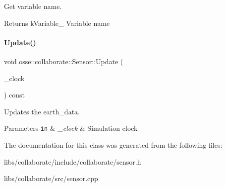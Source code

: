 Get variable name. 

\begin{DoxyReturn}{Returns}
k\+Variable\+\_\+ Variable name 
\end{DoxyReturn}
\mbox{\label{classosse_1_1collaborate_1_1_sensor_a58a36b29c3872dffecfe386610d45095}} 
\paragraph{\texorpdfstring{Update()}{Update()}}
{\footnotesize\ttfamily void osse\+::collaborate\+::\+Sensor\+::\+Update (\begin{DoxyParamCaption}\item[{const \hyperlink{classosse_1_1collaborate_1_1_simulation_clock}{Simulation\+Clock} \&}]{\+\_\+clock }\end{DoxyParamCaption}) const}



Updates the earth\+\_\+data. 


\begin{DoxyParams}[1]{Parameters}
\mbox{\tt in}  & {\em \+\_\+clock} & Simulation clock \\
\hline
\end{DoxyParams}


The documentation for this class was generated from the following files\+:\begin{DoxyCompactItemize}
\item 
libs/collaborate/include/collaborate/sensor.\+h\item 
libs/collaborate/src/sensor.\+cpp\end{DoxyCompactItemize}
